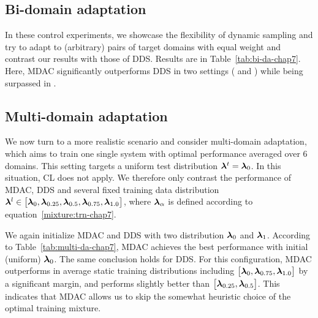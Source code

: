 \subsection{Bi-domain adaptation}\label{ssec:bida-chap7}

In these control experiments, we showcase the flexibility of dynamic sampling and try to adapt to (arbitrary) pairs of target domains with equal weight and contrast our results with those of DDS. Results are in Table~\ref{tab:bi-da-chap7}. Here, MDAC significantly outperforms DDS in two settings ( and ) while being surpassed in .

\subsection{Multi-domain adaptation}\label{ssec:mda-chap7}

We now turn to a more realistic scenario and consider multi-domain adaptation, which aims to train one single system with optimal performance averaged over 6 domains. This setting targets a uniform test distribution $\bm{\lambda}^t = \bm{\lambda}_0$. In this situation, CL \citep{Zhang19curriculum} does not apply. We therefore only contrast the performance of MDAC, DDS and several fixed training data distribution $\bm{\lambda}^l \in \big[ \bm{\lambda}_0, \bm{\lambda}_{0.25}, \bm{\lambda}_{0.5}, \bm{\lambda}_{0.75}, \bm{\lambda}_{1.0}\big]$, where $\bm{\lambda}_{\alpha}$ is defined according to equation~\eqref{mixture:trn-chap7}.

We again initialize MDAC and DDS with two distribution $\bm{\lambda}_0$ and $\bm{\lambda}_1$. According to Table~\ref{tab:multi-da-chap7}, MDAC achieves the best performance with initial (uniform) $\bm{\lambda}_0$. The same conclusion holds for DDS. For this configuration, MDAC outperforms in average static training distributions including $\big[ \bm{\lambda}_0, \bm{\lambda}_{0.75}, \bm{\lambda}_{1.0}\big]$ by a significant margin, and performs slightly better than $\big[ \bm{\lambda}_{0.25}, \bm{\lambda}_{0.5} \big]$. This indicates that MDAC allows us to skip the somewhat heuristic choice of the optimal training mixture.

